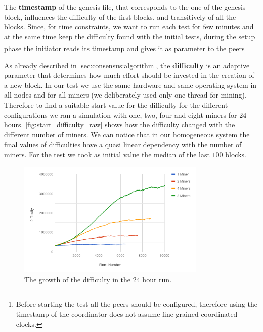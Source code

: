 The \textbf{timestamp} of the genesis file, that corresponds to the one of the
genesis block, influences the difficulty of the first blocks, and transitively
of all the blocks.
Since, for time constraints, we want to run each test for few minutes and
at the same time keep the difficulty found with the initial tests,
during the setup phase the initiator reads its timestamp and gives it
as parameter to the peers\footnote{Before starting the test all the
peers should be configured, therefore using the timestamp of the coordinator
does not assume fine-grained coordinated clocks.}

As already described in \autoref{sec:consensus:algorithm}, the
\textbf{difficulty} is an adaptive parameter  that determines how much effort
should be invested in the creation of a new block. In our test we use the same
hardware and same operating system in all nodes and for all miners (we
deliberately used only one thread for mining). Therefore to find a suitable
start value for the difficulty for the different configurations we ran a
simulation with one, two, four and eight miners for 24 hours.
\autoref{fig:start_difficulty_raw} shows how the difficulty changed with the
different number of miners. We can notice that in our homogeneous system the
final values of difficulties have a quasi linear dependency with the number of
miners. For the test we took as initial value the median of the last $100$
blocks.
\begin{figure}
    \begin{center}
        \includegraphics[width=0.8\textwidth]{./res/img/start_difficulty_all.png}
        \caption{The growth of the difficulty in the 24 hour run.}
        \label{fig:start_difficulty_raw}
    \end{center}
\end{figure}







